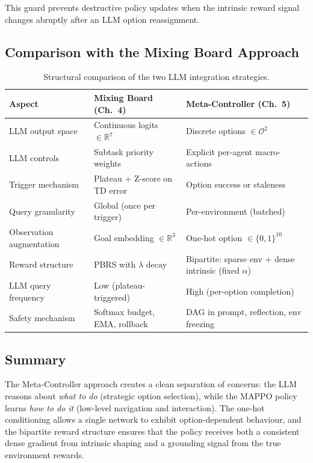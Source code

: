 This guard prevents destructive policy updates when the intrinsic
reward signal changes abruptly after an LLM option reassignment.

\subsection{Comparison with the Mixing Board Approach}
\label{sec:hrl_vs_dyn}

\begin{table}[H]
\centering
\caption{Structural comparison of the two LLM integration strategies.}
\label{tab:approach_comparison}
\small
\begin{tabular}{@{}p{3.5cm}p{5cm}p{5cm}@{}}
\toprule
\textbf{Aspect} & \textbf{Mixing Board (Ch.~4)} & \textbf{Meta-Controller (Ch.~5)} \\
\midrule
LLM output space &
    Continuous logits $\in \mathbb{R}^7$ &
    Discrete options $\in \mathcal{O}^2$ \\
LLM controls &
    Subtask priority weights &
    Explicit per-agent macro-actions \\
Trigger mechanism &
    Plateau + Z-score on TD error &
    Option success or staleness \\
Query granularity &
    Global (once per trigger) &
    Per-environment (batched) \\
Observation augmentation &
    Goal embedding $\in \mathbb{R}^3$ &
    One-hot option $\in \{0,1\}^{10}$ \\
Reward structure &
    PBRS with $\lambda$ decay &
    Bipartite: sparse env + dense intrinsic (fixed $\alpha$) \\
LLM query frequency &
    Low (plateau-triggered) &
    High (per-option completion) \\
Safety mechanism &
    Softmax budget, EMA, rollback &
    DAG in prompt, reflection, env freezing \\
\bottomrule
\end{tabular}
\end{table}


\subsection{Summary}
\label{sec:hrl_summary}

The Meta-Controller approach creates a clean separation of concerns:
the LLM reasons about \emph{what to do} (strategic option selection),
while the MAPPO policy learns \emph{how to do it} (low-level
navigation and interaction). The one-hot conditioning allows a single
network to exhibit option-dependent behaviour, and the bipartite
reward structure ensures that the policy receives both a consistent
dense gradient from intrinsic shaping and a grounding signal from
the true environment rewards.

